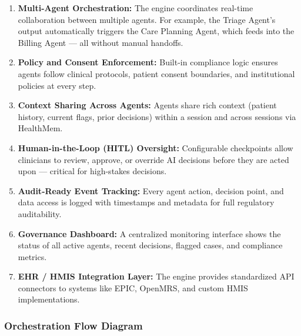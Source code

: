 \documentclass[12pt,a4paper]{article}
\begin{document}
\begin{enumerate}
    \item \textbf{Multi-Agent Orchestration:}
    The engine coordinates real-time collaboration between multiple agents. For example, the Triage Agent's output automatically triggers the Care Planning Agent, which feeds into the Billing Agent — all without manual handoffs.

    \item \textbf{Policy and Consent Enforcement:}
    Built-in compliance logic ensures agents follow clinical protocols, patient consent boundaries, and institutional policies at every step.

    \item \textbf{Context Sharing Across Agents:}
    Agents share rich context (patient history, current flags, prior decisions) within a session and across sessions via HealthMem.

    \item \textbf{Human-in-the-Loop (HITL) Oversight:}
    Configurable checkpoints allow clinicians to review, approve, or override AI decisions before they are acted upon — critical for high-stakes decisions.

    \item \textbf{Audit-Ready Event Tracking:}
    Every agent action, decision point, and data access is logged with timestamps and metadata for full regulatory auditability.

    \item \textbf{Governance Dashboard:}
    A centralized monitoring interface shows the status of all active agents, recent decisions, flagged cases, and compliance metrics.

    \item \textbf{EHR / HMIS Integration Layer:}
    The engine provides standardized API connectors to systems like EPIC, OpenMRS, and custom HMIS implementations.
\end{enumerate}

\subsubsection{Orchestration Flow Diagram}
\end{document}
